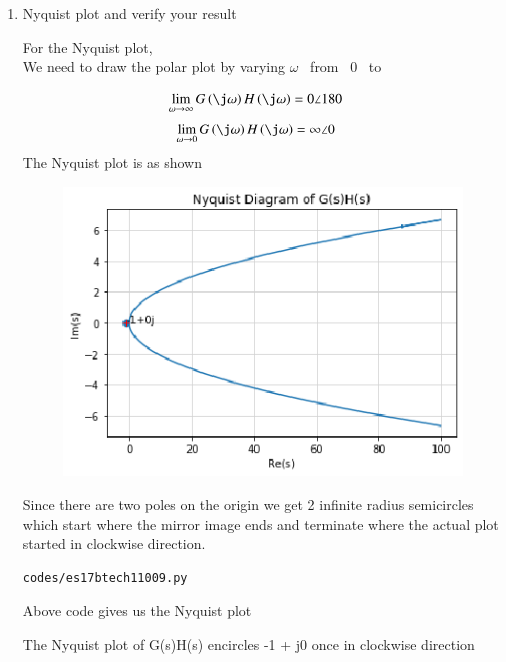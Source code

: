 \begin{enumerate}[label=\thesection.\arabic*.,ref=\thesection.\theenumi]
\item Nyquist plot and verify your result

\solution
 For the Nyquist plot, 
\\
We need to draw the polar plot by varying $\omega$  \ from \ 0 \ to  \ \infty

\begin{align}
 \lim_{\omega\to \infty}{G\brak{\j\omega}H\brak{\j\omega}} &= 0\angle{180}
\end{align}
\begin{align}
\lim_{\omega\to 0}{G\brak{\j\omega}H\brak{\j\omega}} &= \infty\angle{0}
\end{align}
The Nyquist plot is as shown

\begin{figure}[!h]
\centering
\includegraphics[width=\columnwidth]{./figs/es17btech11009.eps}
\caption{}
\label{fig:es17btech11009_1}
\end{figure}

Since there are two poles on the origin we get 2 infinite radius semicircles which start where the mirror image ends and terminate where the actual plot started in clockwise direction.
\begin{lstlisting}
codes/es17btech11009.py
\end{lstlisting}

 Above code gives us the Nyquist plot


The Nyquist plot of G(s)H(s) encircles -1 + j0 once in clockwise direction


\end{enumerate}
